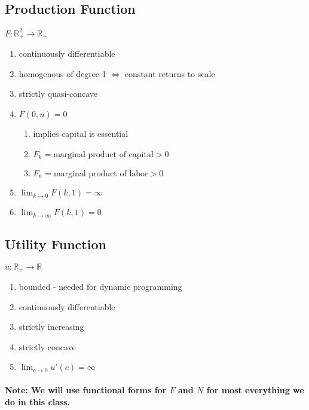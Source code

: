 \documentclass{article}
\begin{document}
\subsection{Production Function}
$F : \mathbb{R}^2_+ \rightarrow \mathbb{R}_+$
\begin{enumerate}
    \item continuously differentiable
    \item homogenous of degree 1 $\Leftrightarrow$ constant returns to scale
    \item strictly quasi-concave
    \item $F(0,n) = 0$
    \begin {enumerate}
        \item implies capital is essential
        \item $F_k = \text{marginal product of capital} > 0$
        \item $F_n = \text{marginal product of labor} > 0$
    \end{enumerate}
    \item $\lim_{k \to 0} F(k,1) = \infty$
    \item $\lim_{k \to \infty} F(k,1) = 0$
\end{enumerate}

\subsection{Utility Function}
$u : \mathbb{R}_+ \rightarrow \mathbb{R}$
\begin{enumerate}
    \item bounded - needed for dynamic programming
    \item continuously differentiable
    \item strictly increasing
    \item strictly concave
    \item $\lim_{c \to 0} u'(c) = \infty$
\end{enumerate}

\paragraph{Note: We will use functional forms for $F$ and $N$ for most everything we do in this class.}

\end{document}
